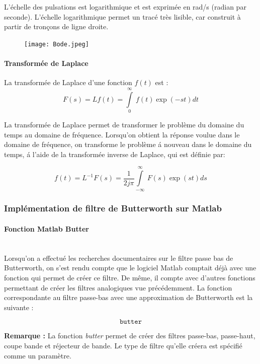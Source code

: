 \documentclass[conference,onecolumn]{IEEEtran}
\begin{document}
L'échelle des pulsations est logarithmique et est exprimée en rad/s (radian par seconde). L'échelle logarithmique permet un tracé très lisible, car construit à partir de tronçons de ligne droite.

\begin{figure}[H]
 \centering
    \texttt{[image: Bode.jpeg]}
\end{figure}

\paragraph{Transformée de Laplace}
La transformée de Laplace d’une fonction $f(t)$ est :
\begin{equation}
    F(s) = L{f(t)} = \int\limits_{0}^{\infty}\ f(t)\exp(-st) dt
\end{equation}

La transformée de Laplace permet de transformer le problème du domaine du temps au domaine de fréquence.
Lorsqu’on obtient la réponse voulue dans le domaine de fréquence, on transforme le problème á nouveau dans le domaine du temps, á l’aide de la transformée inverse de Laplace, qui est définie par:

\begin{equation}
    f(t) = L^{-1}{F(s)} = \frac{1}{2j\pi} \int\limits_{-\infty}^{\infty} \ F(s)\exp(st) ds
\end{equation}

\subsubsection{Implémentation de filtre de Butterworth sur Matlab}

\paragraph{Fonction Matlab Butter}
\hfill \\
Lorsqu’on a  effectué les recherches documentaires sur le filtre passe bas de Butterworth, on s’est rendu compte que le logiciel Matlab comptait déjà avec une fonction qui permet de créer ce filtre. De même, il compte avec d’autres fonctions permettant de créer les filtres analogiques vue précédemment. La fonction correspondante au filtre passe-bas avec une approximation de Butterworth est la suivante :

\[\texttt{butter}\]

\textbf{Remarque :} La fonction \textit{butter} permet de créer des filtres passe-bas, passe-haut, coupe bande et réjecteur de bande. Le type de filtre qu’elle créera est spécifié comme un paramètre.
  
\end{document}
